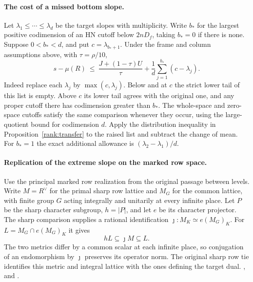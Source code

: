 \paragraph{The cost of a missed bottom slope.}
Let \(\lambda_1\le\cdots\le\lambda_d\) be the target slopes with
multiplicity. Write \(b_*\) for the largest positive codimension of
an HN cutoff below \(2nD_f\), taking \(b_*=0\) if there is none.
Suppose \(0<b_*<d\), and put \(c=\lambda_{b_*+1}\).
Under the frame and column assumptions above, with \(\tau=\rho/10\),
\[
 s-\mu(R)\ \le\ \frac{J+(1-\tau)U}{\tau}
             +\frac1d\sum_{j=1}^{b_*}(c-\lambda_j).
\]
Indeed replace each \(\lambda_j\) by \(\max(c,\lambda_j)\). Below
and at \(c\) the strict lower tail of this list is empty. Above
\(c\) its lower tail agrees with the original one, and any proper
cutoff there has codimension greater than \(b_*\). The whole-space
and zero-space cutoffs satisfy the same comparison whenever they
occur, using the large-quotient bound for codimension \(d\).
Apply the distribution inequality in Proposition~\ref{rank:transfer}
to the raised list and subtract the change of mean. For \(b_*=1\)
the exact additional allowance is \((\lambda_2-\lambda_1)/d\).

\paragraph{Replication of the extreme slope on the marked row space.}
Use the principal marked row realization from the original passage
between levels. Write \(M=R^\vee\) for the primal sharp row lattice
and \(M_G\) for the common lattice, with finite group \(G\) acting
integrally and unitarily at every infinite place. Let \(P\) be the
sharp character subgroup, \(h=|P|\), and let \(e\) be its character
projector. The sharp comparison supplies a rational identification
\(\jmath:M_K\simeq e(M_G)_K\). For \(L=M_G\cap e(M_G)_K\) it gives
\[
             hL\subseteq\jmath M\subseteq L .
\]
The two metrics differ by a common scalar at each infinite place,
so conjugation of an endomorphism by \(\jmath\) preserves its
operator norm. The original sharp row tie identifies this metric
and integral lattice with the ones defining the target dual.
,
 and
.

